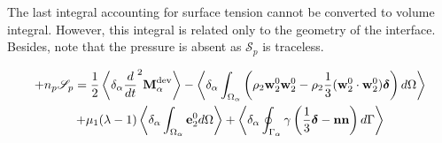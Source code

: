 The last integral accounting for surface tension cannot be converted to volume integral. 
However, this integral is related only to the geometry of the interface. 
Besides, note that the pressure is absent as $\mathscr{S}_p$ is traceless. 

\begin{multline}    
    + n_p \mathscr{S}_p
    =
    \frac{1}{2}\left<\delta_\alpha \frac{d}{dt}^2{\textbf{M}_\alpha^\text{dev}}\right>
    - \left<\delta_\alpha \int_{\Omega_\alpha} \left(
    \rho_2\textbf{w}_2^0 \textbf{w}_2^0
    - \rho_2\frac{1}{3}(\textbf{w}_2^0 \cdot \textbf{w}_2^0)\bm\delta\right) d\Omega\right>\\
    + \mu_1 (\lambda - 1)\left<\delta_\alpha \int_{\Omega_\alpha} \textbf{e}_2^0 d\Omega\right>
    + \left<\delta_\alpha \oint_{\Gamma_\alpha} \gamma\left(\frac{1}{3}\bm\delta-\textbf{nn}\right) d\Gamma\right>\\
\end{multline}

